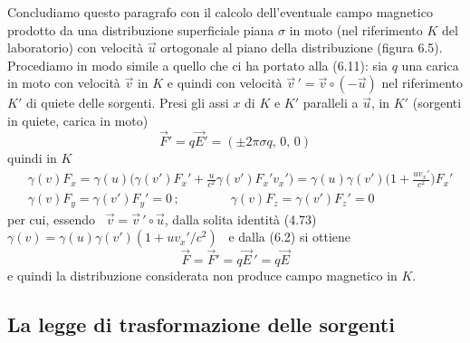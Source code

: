 Concludiamo questo paragrafo con il calcolo dell'eventuale campo magnetico
prodotto da una distribuzione superficiale piana $\sigma$ in moto (nel
riferimento $K$ del laboratorio) con velocit\`a $\vec u$ ortogonale al piano
della distribuzione (figura 6.5). Procediamo in modo simile a quello che ci ha
portato alla (6.11): sia $q$ una carica in moto con velocit\`a $\vec v$ in $K$ e
quindi con velocit\`a $\vec v\,'=\vec v\circ(-\vec u)$ nel riferimento $K'$ di
quiete delle sorgenti. Presi gli assi $x$ di $K$ e $K'$ paralleli a $\vec u$, in
$K'$ (sorgenti in quiete, carica in moto)
\begin{equation}
  \vec F'=q\vec E'=(\pm2\pi\sigma q,\,0,\,0)
  \tag{6.17}
\end{equation}
quindi in $K$
\begin{equation}
  \begin{aligned}
    &\gamma(v)F_x
    =\gamma(u)\Big(\gamma(v')F_x'+\frac{u}{c^2}\gamma(v')F_x'v_x'\Big)
    =\gamma(u)\gamma(v')\Big(1+\frac{uv_x'}{c^2}\Big)F_x'\\
    &\gamma(v)F_y=\gamma(v')F_y'=0\,;\qquad\qquad\gamma(v)F_z=\gamma(v')F_z'=0
  \end{aligned}
  \tag{6.18}
\end{equation}
per cui, essendo \ $\vec v=\vec v\,'\circ\vec u$, dalla solita identit\`a (4.73)
\ $\gamma(v)=\gamma(u)\gamma(v')(1+uv_x'/c^2)$ \ e dalla (6.2) si ottiene
\begin{equation}
  \vec F=\vec F'=q\vec E\,'=q\vec E
  \tag{6.19}
\end{equation}
e quindi la distribuzione considerata non produce campo magnetico in $K$.

\subsection{La legge di trasformazione delle sorgenti}

